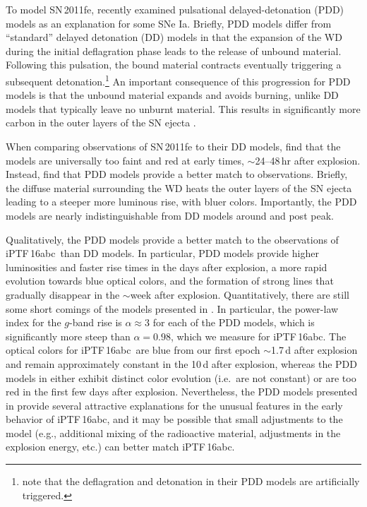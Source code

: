 \documentclass[twocolumn]{aastex61}
\newcommand{\abc}{iPTF\,16abc}
\begin{document}
To model SN\,2011fe, \citet{2014MNRAS.441..532D} recently examined pulsational delayed-detonation (PDD) models as an explanation for some SNe Ia. Briefly, PDD models differ from ``standard'' delayed detonation (DD) models in that the expansion of the WD during the initial deflagration phase leads to the release of unbound material. Following this pulsation, the bound material contracts eventually triggering a subsequent detonation.\footnote{\citet{2014MNRAS.441..532D} note that the deflagration and detonation in their PDD models are artificially triggered.} An important consequence of this progression for PDD models is that the unbound material expands and avoids burning, unlike DD models that typically leave no unburnt material. This results in significantly more carbon in the outer layers of the SN ejecta \citep{2014MNRAS.441..532D}.

When comparing observations of SN\,2011fe to their DD models, \citet{2014MNRAS.441..532D} find that the models are universally too faint and red at early times, $\sim$24--48\,hr after explosion.  Instead, \citet{2014MNRAS.441..532D} find that PDD models provide a better match to observations. Briefly, the diffuse material surrounding the WD heats the outer layers of the SN ejecta leading to a steeper more luminous rise, with bluer colors. Importantly, the PDD models are nearly indistinguishable from DD models around and post peak. 

Qualitatively, the PDD models provide a better match to the observations of \abc\ than DD models. In particular, PDD models provide higher luminosities and faster rise times in the days after explosion, a more rapid evolution towards blue optical colors, and the formation of strong  lines that gradually disappear in the $\sim$week after explosion. Quantitatively, there are still some short comings of the models presented in \citet{2014MNRAS.441..532D}. In particular, the power-law index for the $g$-band rise is $\alpha \approx 3$ for each of the PDD models, which is significantly more steep than $\alpha = 0.98$, which we measure for \abc. The optical colors for \abc\ are blue from our first epoch $\sim$1.7\,d after explosion and remain approximately constant in the 10\,d after explosion, whereas the PDD models in \citet{2014MNRAS.441..532D} either exhibit distinct color evolution (i.e.\ are not constant) or are too red in the first few days after explosion. Nevertheless, the PDD models presented in \citet{2014MNRAS.441..532D} provide several attractive explanations for the unusual features in the early behavior of \abc, and it may be possible that small adjustments to the model (e.g., additional mixing of the radioactive material, adjustments in the explosion energy, etc.) can better match \abc.
\end{document}
